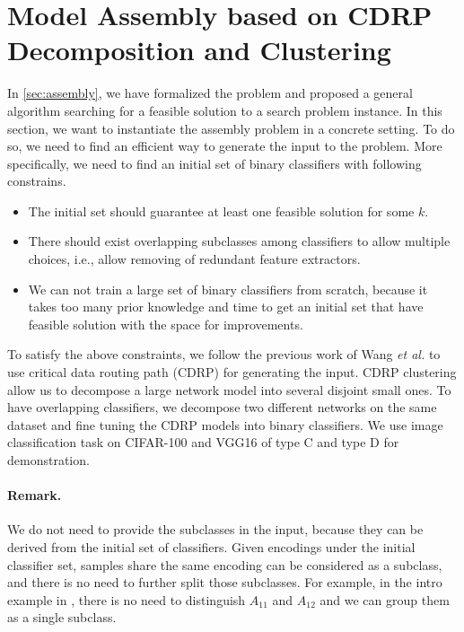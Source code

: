 \documentclass[sigplan,10pt,review]{acmart}\settopmatter{printfolios=true,printccs=false,printacmref=false}
\begin{document}
\section{Model Assembly based on CDRP Decomposition and Clustering}
\label{sec:cdrp}
In \cref{sec:assembly}, we have formalized the problem and proposed a general algorithm searching for a feasible solution to a search problem instance.
In this section, we want to instantiate the assembly problem in a concrete setting.
To do so, we need to find an efficient way to generate the input to the problem.
More specifically, we need to find an initial set of binary classifiers with following constrains.
\begin{itemize}
	\item The initial set should guarantee at least one feasible solution for some $k$.
	\item There should exist overlapping subclasses among classifiers to allow multiple choices, i.e., allow removing of redundant feature extractors.
	\item We can not train a large set of binary classifiers from scratch, because it takes too many prior knowledge and time to get an initial set that have feasible solution with the space for improvements.
\end{itemize}

To satisfy the above constraints, we follow the previous work of Wang \textit{et al.} \cite{wang2018interpret} to use critical data routing path (CDRP) for generating the input.
CDRP clustering allow us to decompose a large network model into several disjoint small ones.
To have overlapping classifiers, we decompose two different networks on the same dataset and fine tuning the CDRP models into binary classifiers.
We use image classification task on CIFAR-100 and VGG16 of type C and type D for demonstration.

\paragraph{Remark.} We do not need to provide the subclasses in the input, because they can be derived from the initial set of classifiers.
Given encodings under the initial classifier set, samples share the same encoding can be considered as a subclass, and there is no need to further split those subclasses.
For example, in the intro example in , there is no need to distinguish $A_{11}$ and $A_{12}$ and we can group them as a single subclass.
\end{document}
